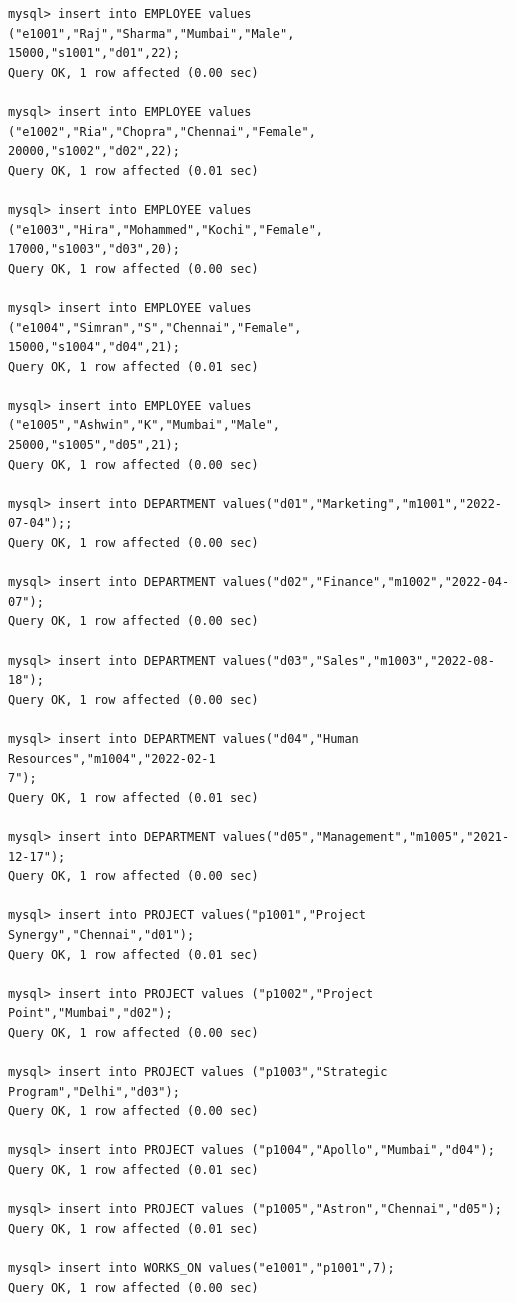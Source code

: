 \documentclass[a4paper,12pt]{report}
\begin{document}
\begin{verbatim}
mysql> insert into EMPLOYEE values ("e1001","Raj","Sharma","Mumbai","Male",
15000,"s1001","d01",22);
Query OK, 1 row affected (0.00 sec)

mysql> insert into EMPLOYEE values ("e1002","Ria","Chopra","Chennai","Female",
20000,"s1002","d02",22);
Query OK, 1 row affected (0.01 sec)

mysql> insert into EMPLOYEE values ("e1003","Hira","Mohammed","Kochi","Female",
17000,"s1003","d03",20);
Query OK, 1 row affected (0.00 sec)

mysql> insert into EMPLOYEE values ("e1004","Simran","S","Chennai","Female",
15000,"s1004","d04",21); 
Query OK, 1 row affected (0.01 sec)

mysql> insert into EMPLOYEE values ("e1005","Ashwin","K","Mumbai","Male",
25000,"s1005","d05",21);
Query OK, 1 row affected (0.00 sec)

mysql> insert into DEPARTMENT values("d01","Marketing","m1001","2022-07-04");;
Query OK, 1 row affected (0.00 sec)

mysql> insert into DEPARTMENT values("d02","Finance","m1002","2022-04-07");
Query OK, 1 row affected (0.00 sec)

mysql> insert into DEPARTMENT values("d03","Sales","m1003","2022-08-18");
Query OK, 1 row affected (0.00 sec)

mysql> insert into DEPARTMENT values("d04","Human Resources","m1004","2022-02-1
7");
Query OK, 1 row affected (0.01 sec)

mysql> insert into DEPARTMENT values("d05","Management","m1005","2021-12-17");
Query OK, 1 row affected (0.00 sec)

mysql> insert into PROJECT values("p1001","Project Synergy","Chennai","d01");
Query OK, 1 row affected (0.01 sec)

mysql> insert into PROJECT values ("p1002","Project Point","Mumbai","d02");
Query OK, 1 row affected (0.00 sec)

mysql> insert into PROJECT values ("p1003","Strategic Program","Delhi","d03");
Query OK, 1 row affected (0.00 sec)

mysql> insert into PROJECT values ("p1004","Apollo","Mumbai","d04");
Query OK, 1 row affected (0.01 sec)

mysql> insert into PROJECT values ("p1005","Astron","Chennai","d05");
Query OK, 1 row affected (0.01 sec)

mysql> insert into WORKS_ON values("e1001","p1001",7);
Query OK, 1 row affected (0.00 sec)


\end{verbatim}
\end{document}
